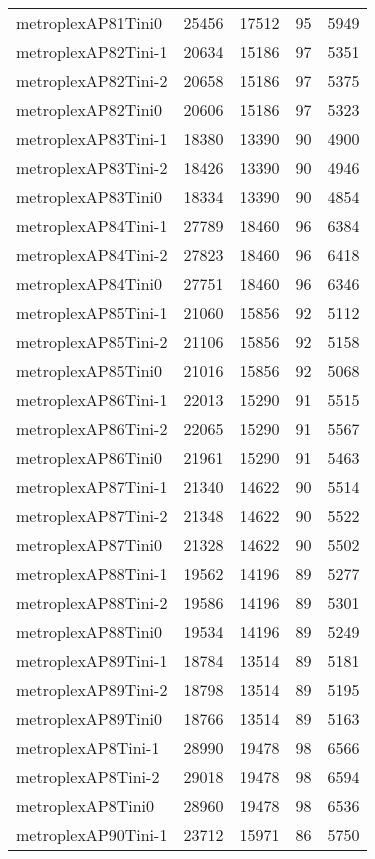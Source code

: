 \begin{tabular}{lrrrr}
metroplexAP81Tini0 & 25456 & 17512 & 95 & 5949 \\
metroplexAP82Tini-1 & 20634 & 15186 & 97 & 5351 \\
metroplexAP82Tini-2 & 20658 & 15186 & 97 & 5375 \\
metroplexAP82Tini0 & 20606 & 15186 & 97 & 5323 \\
metroplexAP83Tini-1 & 18380 & 13390 & 90 & 4900 \\
metroplexAP83Tini-2 & 18426 & 13390 & 90 & 4946 \\
metroplexAP83Tini0 & 18334 & 13390 & 90 & 4854 \\
metroplexAP84Tini-1 & 27789 & 18460 & 96 & 6384 \\
metroplexAP84Tini-2 & 27823 & 18460 & 96 & 6418 \\
metroplexAP84Tini0 & 27751 & 18460 & 96 & 6346 \\
metroplexAP85Tini-1 & 21060 & 15856 & 92 & 5112 \\
metroplexAP85Tini-2 & 21106 & 15856 & 92 & 5158 \\
metroplexAP85Tini0 & 21016 & 15856 & 92 & 5068 \\
metroplexAP86Tini-1 & 22013 & 15290 & 91 & 5515 \\
metroplexAP86Tini-2 & 22065 & 15290 & 91 & 5567 \\
metroplexAP86Tini0 & 21961 & 15290 & 91 & 5463 \\
metroplexAP87Tini-1 & 21340 & 14622 & 90 & 5514 \\
metroplexAP87Tini-2 & 21348 & 14622 & 90 & 5522 \\
metroplexAP87Tini0 & 21328 & 14622 & 90 & 5502 \\
metroplexAP88Tini-1 & 19562 & 14196 & 89 & 5277 \\
metroplexAP88Tini-2 & 19586 & 14196 & 89 & 5301 \\
metroplexAP88Tini0 & 19534 & 14196 & 89 & 5249 \\
metroplexAP89Tini-1 & 18784 & 13514 & 89 & 5181 \\
metroplexAP89Tini-2 & 18798 & 13514 & 89 & 5195 \\
metroplexAP89Tini0 & 18766 & 13514 & 89 & 5163 \\
metroplexAP8Tini-1 & 28990 & 19478 & 98 & 6566 \\
metroplexAP8Tini-2 & 29018 & 19478 & 98 & 6594 \\
metroplexAP8Tini0 & 28960 & 19478 & 98 & 6536 \\
metroplexAP90Tini-1 & 23712 & 15971 & 86 & 5750 \\

\end{tabular}
